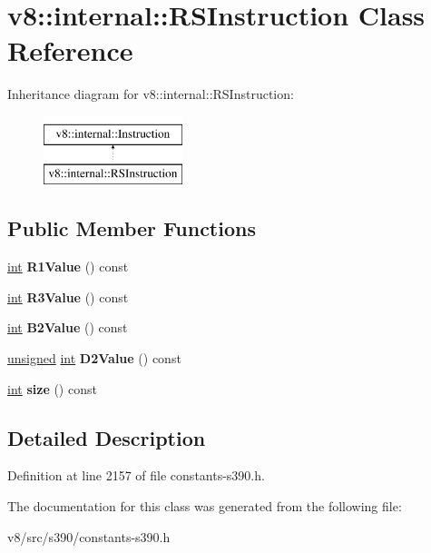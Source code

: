 \hypertarget{classv8_1_1internal_1_1RSInstruction}{}\section{v8\+:\+:internal\+:\+:R\+S\+Instruction Class Reference}
\label{classv8_1_1internal_1_1RSInstruction}
Inheritance diagram for v8\+:\+:internal\+:\+:R\+S\+Instruction\+:\begin{figure}[H]
\begin{center}
\leavevmode
\includegraphics[height=2.000000cm]{classv8_1_1internal_1_1RSInstruction}
\end{center}
\end{figure}
\subsection*{Public Member Functions}
\begin{DoxyCompactItemize}
\item 
\mbox{\label{classv8_1_1internal_1_1RSInstruction_a2ec053172f9481fee41e4b966c26037e}} 
\mbox{\hyperlink{classint}{int}} {\bfseries R1\+Value} () const
\item 
\mbox{\label{classv8_1_1internal_1_1RSInstruction_a95e79f0379214d0e1a646b629e60a09d}} 
\mbox{\hyperlink{classint}{int}} {\bfseries R3\+Value} () const
\item 
\mbox{\label{classv8_1_1internal_1_1RSInstruction_a79489e138007693f9dd109400e171c4b}} 
\mbox{\hyperlink{classint}{int}} {\bfseries B2\+Value} () const
\item 
\mbox{\label{classv8_1_1internal_1_1RSInstruction_acaf3b746660da36a427452cff37265d7}} 
\mbox{\hyperlink{classunsigned}{unsigned}} \mbox{\hyperlink{classint}{int}} {\bfseries D2\+Value} () const
\item 
\mbox{\label{classv8_1_1internal_1_1RSInstruction_aaaa40d73e2c667f35b3e8b1ac089ba71}} 
\mbox{\hyperlink{classint}{int}} {\bfseries size} () const
\end{DoxyCompactItemize}


\subsection{Detailed Description}


Definition at line 2157 of file constants-\/s390.\+h.



The documentation for this class was generated from the following file\+:\begin{DoxyCompactItemize}
\item 
v8/src/s390/constants-\/s390.\+h\end{DoxyCompactItemize}
